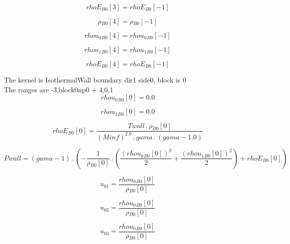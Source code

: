 \documentclass{article}
\begin{document}
\begin{dmath}{rhoE{_{B0}}}[{3}] = {rhoE{_{B0}}}[{-1}]\end{dmath}

\begin{dmath}{\rho{_{B0}}}[{4}] = {\rho{_{B0}}}[{-1}]\end{dmath}

\begin{dmath}{rhou_{0}{_{B0}}}[{4}] = {rhou_{0}{_{B0}}}[{-1}]\end{dmath}

\begin{dmath}{rhou_{1}{_{B0}}}[{4}] = {rhou_{1}{_{B0}}}[{-1}]\end{dmath}

\begin{dmath}{rhoE{_{B0}}}[{4}] = {rhoE{_{B0}}}[{-1}]\end{dmath}

\noindent The kernel is IsothermalWall boundary dir1 side0, block is 0\\\noindent The ranges are -3,block0np0 + 4,0,1\\\begin{dmath}{rhou_{0}{_{B0}}}[{0}] = 0.0\end{dmath}

\begin{dmath}{rhou_{1}{_{B0}}}[{0}] = 0.0\end{dmath}

\begin{dmath}{rhoE{_{B0}}}[{0}] = \frac{Twall \,.\, {\rho{_{B0}}}[{0}]}{\left(Minf \right)^{2.0} \,.\, gama \,.\, \left(gama - 1.0\right)}\end{dmath}

\begin{dmath}Pwall = \left(gama - 1\right) \,.\, \left(- \frac{1}{{\rho{_{B0}}}[{0}]} \,.\, \left(\frac{\left({rhou_{0}{_{B0}}}[{0}] \right)^{2}}{2} + \frac{\left({rhou_{1}{_{B0}}}[{0}] \right)^{2}}{2}\right) + {rhoE{_{B0}}}[{0}]\right)\end{dmath}

\begin{dmath}u_{01} = \frac{{rhou_{0}{_{B0}}}[{0}]}{{\rho{_{B0}}}[{0}]}\end{dmath}

\begin{dmath}u_{02} = \frac{{rhou_{0}{_{B0}}}[{0}]}{{\rho{_{B0}}}[{0}]}\end{dmath}

\begin{dmath}u_{03} = \frac{{rhou_{0}{_{B0}}}[{0}]}{{\rho{_{B0}}}[{0}]}\end{dmath}
\end{document}
